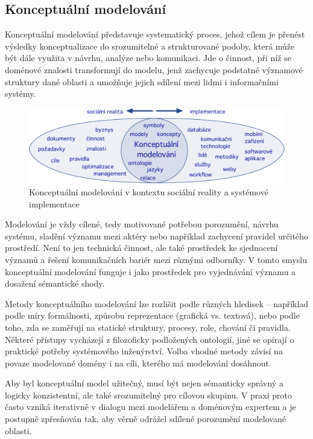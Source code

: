 \subsection{Konceptuální modelování}
\label{sec:konceptuální-modelování}
Konceptuální modelování představuje systematický proces, jehož cílem je přenést výsledky konceptualizace do srozumitelné a strukturované podoby, která může být dále využita v návrhu, analýze nebo komunikaci. Jde o činnost, při níž se doménové znalosti transformují do modelu, jenž zachycuje podstatné významové struktury dané oblasti a umožňuje jejich sdílení mezi lidmi i informačními systémy. \cite{Pergl2018,Guizzardi2008}

\begin{figure}[H]
  \centering
  \includegraphics[width=\textwidth]{images/conceptual_modelling.png}
  \caption{Konceptuální modelování v kontextu sociální reality a systémové implementace \cite{CCMi}}
  \label{fig:conceptual_modelling}
\end{figure}

Modelování je vždy cílené, tedy motivované potřebou porozumění, návrhu systému, sladění významu mezi aktéry nebo například zachycení pravidel určitého prostředí. Není to jen technická činnost, ale také prostředek ke sjednocení významů a řešení komunikačních bariér mezi různými odborníky. V tomto smyslu konceptuální modelování funguje i jako prostředek pro vyjednávání významu a dosažení sémantické shody. \cite{Hoppenbrouwers2005}

Metody konceptuálního modelování lze rozlišit podle různých hledisek – například podle míry formálnosti, způsobu reprezentace (grafická vs. textová), nebo podle toho, zda se zaměřují na statické struktury, procesy, role, chování či pravidla. Některé přístupy vycházejí z filozoficky podložených ontologií, jiné se opírají o praktické potřeby systémového inženýrství. Volba vhodné metody závisí na povaze modelované domény i na cíli, kterého má modelování dosáhnout. \cite{Onggo2010}

Aby byl konceptuální model užitečný, musí být nejen sémanticky správný a logicky konzistentní, ale také srozumitelný pro cílovou skupinu. V praxi proto často vzniká iterativně v dialogu mezi modelářem a doménovým expertem a je postupně zpřesňován tak, aby věrně odrážel sdílené porozumění modelované oblasti. \cite{Thalheim2011}

